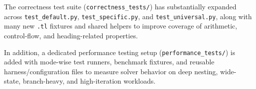 \noindent
The correctness test suite (\texttt{correctness\_tests/}) has substantially expanded across
\texttt{test\_default.py}, \texttt{test\_specific.py}, and
\texttt{test\_universal.py}, along with many new \texttt{.tl} fixtures and shared
helpers to improve coverage of arithmetic, control-flow, and heading-related
properties.

In addition, a dedicated performance testing setup (\texttt{performance\_tests/}) is added with mode-wise test
runners, benchmark fixtures, and reusable harness/configuration files to measure
solver behavior on deep nesting, wide-state, branch-heavy, and high-iteration
workloads.
